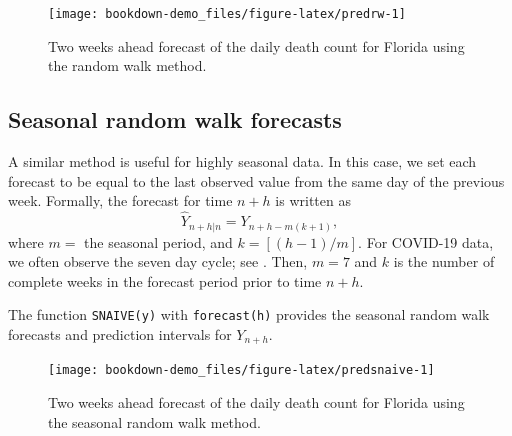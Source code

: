 \documentclass[]{book}
\newenvironment{Shaded}{\begin{snugshade}}{\end{snugshade}}
\newcommand{\KeywordTok}[1]{\textcolor[rgb]{0.13,0.29,0.53}{\textbf{#1}}}
\newcommand{\DataTypeTok}[1]{\textcolor[rgb]{0.13,0.29,0.53}{#1}}
\newcommand{\DecValTok}[1]{\textcolor[rgb]{0.00,0.00,0.81}{#1}}
\newcommand{\StringTok}[1]{\textcolor[rgb]{0.31,0.60,0.02}{#1}}
\newcommand{\OperatorTok}[1]{\textcolor[rgb]{0.81,0.36,0.00}{\textbf{#1}}}
\newcommand{\NormalTok}[1]{#1}
\begin{document}
\begin{figure}

{\centering \texttt{[image: bookdown-demo\_files/figure-latex/predrw-1]} 

}

\caption{Two weeks ahead forecast of the daily death count for Florida using the random walk method.}\label{fig:predrw}
\end{figure}

\subsection{Seasonal random walk
forecasts}\label{seasonal-random-walk-forecasts}

A similar method is useful for highly seasonal data. In this case, we
set each forecast to be equal to the last observed value from the same
day of the previous week. Formally, the forecast for time \(n+h\) is
written as \[
\hat{Y}_{n+h|n}=Y_{n+h-m(k+1)},
\] where \(m=\) the seasonal period, and \(k=[(h-1)/m]\). For COVID-19
data, we often observe the seven day cycle; see
\citet{wang:2020:comparing}. Then, \(m=7\) and \(k\) is the number of
complete weeks in the forecast period prior to time \(n+h\).

The function \texttt{SNAIVE(y)} with \texttt{forecast(h)} provides the
seasonal random walk forecasts and prediction intervals for \(Y_{n+h}\).

\begin{Shaded}
\end{Shaded}

\begin{figure}

{\centering \texttt{[image: bookdown-demo\_files/figure-latex/predsnaive-1]} 

}

\caption{Two weeks ahead forecast of the daily death count for Florida using the seasonal random walk method.}\label{fig:predsnaive}
\end{figure}
\end{document}
